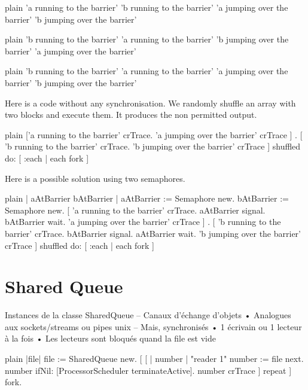 \documentclass[10pt,twoside,english]{_support/latex/sbabook/sbabook}
\begin{document}
\begin{displaycode}{plain}
'a running to the barrier'
'b running to the barrier'
'a jumping over the barrier'
'b jumping over the barrier'
\end{displaycode}

\begin{displaycode}{plain}
'b running to the barrier'	
'a running to the barrier'
'b jumping over the barrier'
'a jumping over the barrier'
\end{displaycode}

\begin{displaycode}{plain}
'b running to the barrier'	
'a running to the barrier'
'a jumping over the barrier'
'b jumping over the barrier'
\end{displaycode}

Here is a code without any synchronisation. We randomly shuffle an array with two blocks and execute them. 
It produces the non permitted output. 

\begin{displaycode}{plain}
{  
['a running to the barrier' crTrace.
'a jumping over the barrier' crTrace ] 
.
[ 'b running to the barrier' crTrace.
'b jumping over the barrier' crTrace ] 
} shuffled do: [ :each | each fork ]
\end{displaycode}

Here is a possible solution using two semaphores. 

\begin{displaycode}{plain}
| aAtBarrier bAtBarrier |
aAtBarrier := Semaphore new.
bAtBarrier := Semaphore new.
{[ 'a running to the barrier' crTrace.
aAtBarrier signal. 
bAtBarrier wait.
'a jumping over the barrier' crTrace ] 
.
[ 'b running to the barrier' crTrace.
bAtBarrier signal. 
aAtBarrier wait.
'b jumping over the barrier' crTrace ] 
} shuffled do: [ :each | each fork ]
\end{displaycode}
\section{Shared Queue}
Instances de la classe SharedQueue  –  Canaux d'échange d'objets 
•  Analogues aux sockets/streams ou pipes unix  –  Mais, synchronisés 
•  1 écrivain ou 1 lecteur à la fois 
•  Les lecteurs sont bloqués quand la file est vide

\begin{displaycode}{plain}
|file| 
file := SharedQueue new.
[
	[ | number | "reader 1"
	number := file next.
	number ifNil: [ProcessorScheduler terminateActive].
	number crTrace ] repeat
	] fork. 
\end{displaycode}
\end{document}
